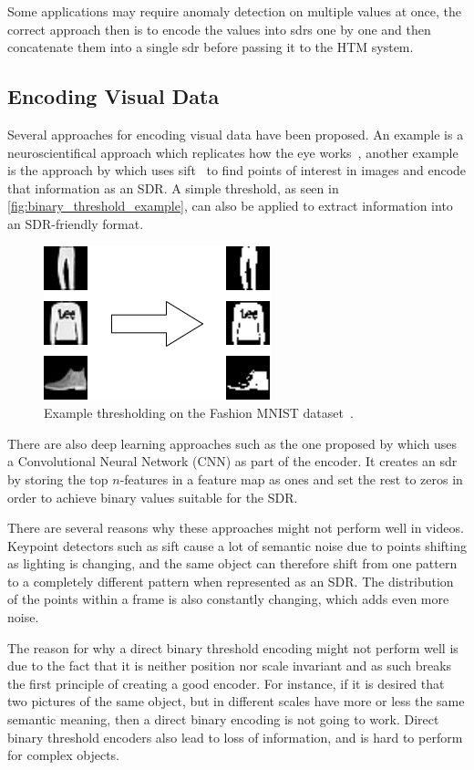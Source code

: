 \par
Some applications may require anomaly detection on multiple values at once, the correct approach then is to encode the values into \glspl*{sdr} one by one and then concatenate them into a single \gls*{sdr} before passing it to the HTM system.
\subsection{Encoding Visual Data}
Several approaches for encoding visual data have been proposed. An example is a neuroscientifical approach which replicates how the eye works~\cite{eyeencoder}, another example is the approach by \textcite{ObjectDetectionSIFT} which uses \gls*{sift}~\cite{sift} to find points of interest in images and encode that information as an SDR. A simple threshold, as seen in \autoref{fig:binary_threshold_example}, can also be applied to extract information into an SDR-friendly format.
\begin{figure}[htb]
    \centering
    \includegraphics[width=0.3\linewidth]{resources/related_works/binary_threshold_example.png}
    \caption[Thresholding Example]{Example thresholding on the Fashion MNIST dataset~\cite{mnist_fashion}.}
    \label{fig:binary_threshold_example}
\end{figure}
\par
There are also deep learning approaches such as the one proposed by \textcite{CNN_HTM} which uses a Convolutional Neural Network (CNN) as part of the encoder. It creates an \gls*{sdr} by storing the top $n$-features in a feature map as ones and set the rest to zeros in order to achieve binary values suitable for the SDR.
\par
There are several reasons why these approaches might not perform well in videos. Keypoint detectors such as \gls*{sift} cause a lot of semantic noise due to points shifting as lighting is changing, and the same object can therefore shift from one pattern to a completely different pattern when represented as an SDR. The distribution of the points within a frame is also constantly changing, which adds even more noise.
\par
The reason for why a direct binary threshold encoding might not perform well is due to the fact that it is neither position nor scale invariant and as such breaks the first principle of creating a good encoder. For instance, if it is desired that two pictures of the same object, but in different scales have more or less the same semantic meaning, then a direct binary encoding is not going to work. Direct binary threshold encoders also lead to loss of information, and is hard to perform for complex objects.
